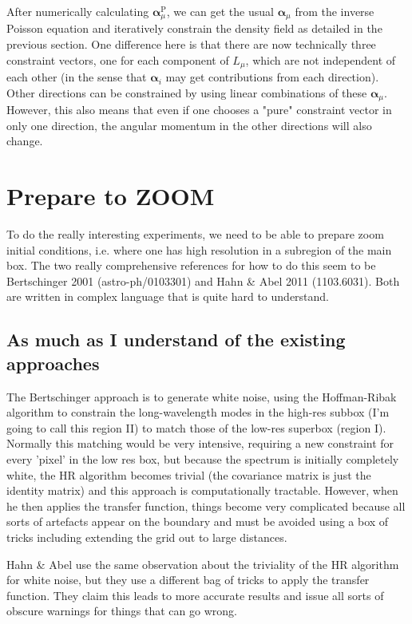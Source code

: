 \documentclass[11pt,a4paper,preprint]{aastex}
\newcommand{\bmath}[1]{\ensuremath{\bm{#1}}}
\renewcommand{\vec}[1]{\bmath{#1}}
\begin{document}
After numerically calculating $\vec{\alpha}_{\mu}^{\mathrm{P}}$, we can get the usual $\vec{\alpha}_{\mu}$ from the inverse Poisson equation and iteratively constrain the density field as detailed in the previous section. 
One difference here is that there are now technically three constraint
vectors, one for each component of $L_{\mu}$, which are not
independent of each other (in the sense that $\vec{\alpha}_i$ may get
contributions from each direction). Other directions can be
constrained by using linear combinations of these
$\vec{\alpha}_{\mu}$. However, this also means that even if one
chooses a "pure" constraint vector in only one direction, the angular
momentum in the other directions will also change.


\section{Prepare to ZOOM}

To do the really interesting experiments, we need to be able to
prepare zoom initial conditions, i.e. where one has high resolution in
a subregion of the main box. The two really comprehensive references
for how to do this seem to be Bertschinger 2001 (astro-ph/0103301) and
Hahn \& Abel 2011 (1103.6031). Both are written in complex language
that is quite hard to understand. 

\subsection{As much as I understand of the existing approaches}

The Bertschinger approach is to generate white noise, using the
Hoffman-Ribak algorithm to constrain the long-wavelength modes in the
high-res subbox (I'm going to call this region II) to match those of
the low-res superbox (region I). Normally this matching would be very
intensive, requiring a new constraint for every 'pixel' in the low res
box, but because the spectrum is initially completely white, the HR
algorithm becomes trivial (the covariance matrix is just the identity
matrix) and this approach is computationally tractable. However, when
he then applies the transfer function, things become very complicated
because all sorts of artefacts appear on the boundary and must be
avoided using a box of tricks including extending the grid out to
large distances.

Hahn \& Abel use the same observation about the triviality of the HR
algorithm for white noise, but they use a different bag of tricks to
apply the transfer function. They claim this leads to more accurate
results and issue all sorts of obscure warnings for things that can go
wrong.
\end{document}
